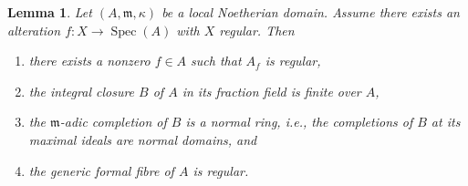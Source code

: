 \documentclass{amsart}
\theoremstyle{plain}
\newtheorem{lemma}[subsection]{Lemma}
\theoremstyle{definition}
\theoremstyle{remark}
\numberwithin{equation}{subsection}
\def\Spec{\mathop{\mathrm{Spec}}}
\begin{document}
\begin{lemma}
\label{lemma-regular-alteration-implies-local}
Let $(A, \mathfrak m, \kappa)$ be a local Noetherian domain.
Assume there exists an alteration $f : X \to \Spec(A)$
with $X$ regular. Then
\begin{enumerate}
\item there exists a nonzero $f \in A$ such that $A_f$ is regular,
\item the integral closure $B$ of $A$ in its fraction field is finite over $A$,
\item the $\mathfrak m$-adic completion of $B$ is a normal ring, i.e., the
completions of $B$ at its maximal ideals are normal domains, and
\item the generic formal fibre of $A$ is regular.
\end{enumerate}
\end{lemma}
\end{document}
